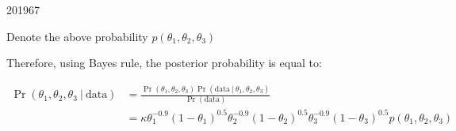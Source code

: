 \documentclass[10pt,\jkfside,a4paper]{article}
\begin{document}
\begin{examquestion}{2019}{6}{7}
\begin{enumerate}[label=(\alph*)]
Denote the above probability $p(\theta_1, \theta_2, \theta_3)$

Therefore, using Bayes rule, the posterior probability is equal to:

\[
\begin{split}
\Pr(\theta_1, \theta_2, \theta_3 \ | \ \text{data})
&= \frac{\Pr(\theta_1, \theta_2, \theta_3)\Pr(\text{data} \ | \ \theta_1,
\theta_2, \theta_3)}{\Pr(\text{data})} \\
&= \kappa \theta_1^{-0.9}(1 - \theta_1)^{0.5}\theta_2^{-0.9}(1 - \theta_2)
^{0.5}\theta_3^{-0.9}(1 - \theta_3)^{0.5}p(\theta_1, \theta_2, \theta_3)\\
\end{split}
\]


\end{enumerate}

\end{examquestion}
\end{document}
